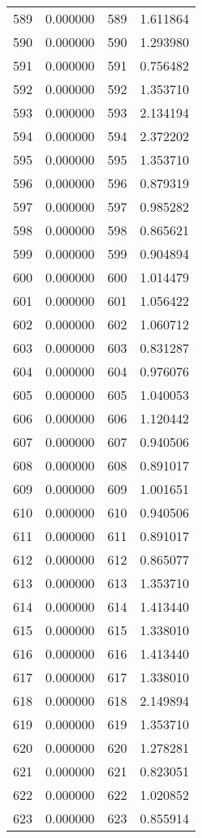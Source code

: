 \documentclass[12pt]{article}
\begin{document}
\begin{longtable}{@{}cccc@{}}
589 & 0.000000 & 589 & 1.611864 \\
590 & 0.000000 & 590 & 1.293980 \\
591 & 0.000000 & 591 & 0.756482 \\
592 & 0.000000 & 592 & 1.353710 \\
593 & 0.000000 & 593 & 2.134194 \\
594 & 0.000000 & 594 & 2.372202 \\
595 & 0.000000 & 595 & 1.353710 \\
596 & 0.000000 & 596 & 0.879319 \\
597 & 0.000000 & 597 & 0.985282 \\
598 & 0.000000 & 598 & 0.865621 \\
599 & 0.000000 & 599 & 0.904894 \\
600 & 0.000000 & 600 & 1.014479 \\
601 & 0.000000 & 601 & 1.056422 \\
602 & 0.000000 & 602 & 1.060712 \\
603 & 0.000000 & 603 & 0.831287 \\
604 & 0.000000 & 604 & 0.976076 \\
605 & 0.000000 & 605 & 1.040053 \\
606 & 0.000000 & 606 & 1.120442 \\
607 & 0.000000 & 607 & 0.940506 \\
608 & 0.000000 & 608 & 0.891017 \\
609 & 0.000000 & 609 & 1.001651 \\
610 & 0.000000 & 610 & 0.940506 \\
611 & 0.000000 & 611 & 0.891017 \\
612 & 0.000000 & 612 & 0.865077 \\
613 & 0.000000 & 613 & 1.353710 \\
614 & 0.000000 & 614 & 1.413440 \\
615 & 0.000000 & 615 & 1.338010 \\
616 & 0.000000 & 616 & 1.413440 \\
617 & 0.000000 & 617 & 1.338010 \\
618 & 0.000000 & 618 & 2.149894 \\
619 & 0.000000 & 619 & 1.353710 \\
620 & 0.000000 & 620 & 1.278281 \\
621 & 0.000000 & 621 & 0.823051 \\
622 & 0.000000 & 622 & 1.020852 \\
623 & 0.000000 & 623 & 0.855914 \\

\end{longtable}
\end{document}
